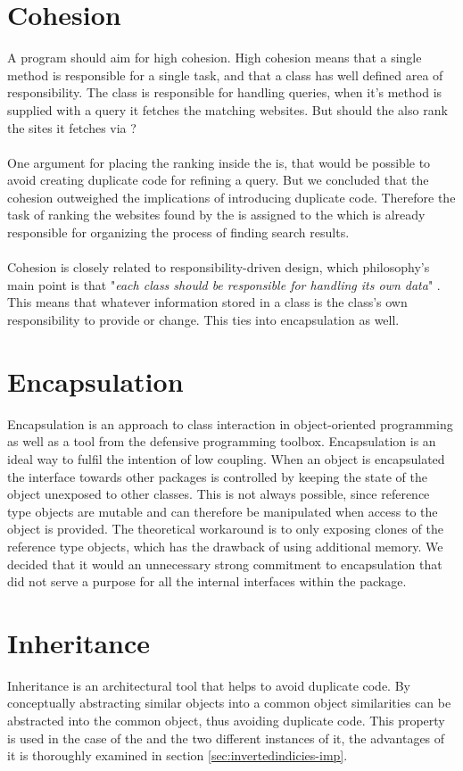 \section{Cohesion}
A program should aim for high cohesion. High cohesion means that a single method is responsible for a single task, and that a class has well defined area of responsibility. \cite[p.274]{BK}
The class  is responsible for handling queries, when it's method  is supplied with a query it fetches the matching websites. But should the  also rank the sites it fetches via ? 
\\ \\
One argument for placing the ranking inside the  is, that would be possible to avoid creating duplicate code for refining a query. But we concluded that the cohesion outweighed the implications of introducing duplicate code. Therefore the task of ranking the websites found by the  is assigned to the   which is already responsible for organizing the process of finding search results.
\\ \\
Cohesion is closely related to responsibility-driven design, which philosophy's main point is that "\textit{each class should be responsible for handling its own data}" \cite[270]{BK}. This means that whatever information stored in a class is the class's own responsibility to provide or change. This ties into encapsulation as well.

\section{Encapsulation}
Encapsulation is an approach to class interaction in object-oriented programming as well as a tool from the defensive programming toolbox. Encapsulation is an ideal way to fulfil the intention of low coupling. When an object is encapsulated the interface towards other packages is controlled by keeping the state of the object unexposed to other classes. This is not always possible, since reference type objects are mutable and can therefore be manipulated when access to the object is provided. The theoretical workaround is to only exposing clones of the reference type objects, which has the drawback of using additional memory. We decided that it would an unnecessary strong commitment to encapsulation that did not serve a purpose for all the internal interfaces within the  package.

\section{Inheritance} 
Inheritance is an architectural tool that helps to avoid duplicate code. By conceptually abstracting similar objects into a common object similarities can be abstracted into the common object, thus avoiding duplicate code. This property is used in the case of the  and the two different instances of it, the advantages of it is thoroughly examined in section \ref{sec:invertedindicies-imp}.

